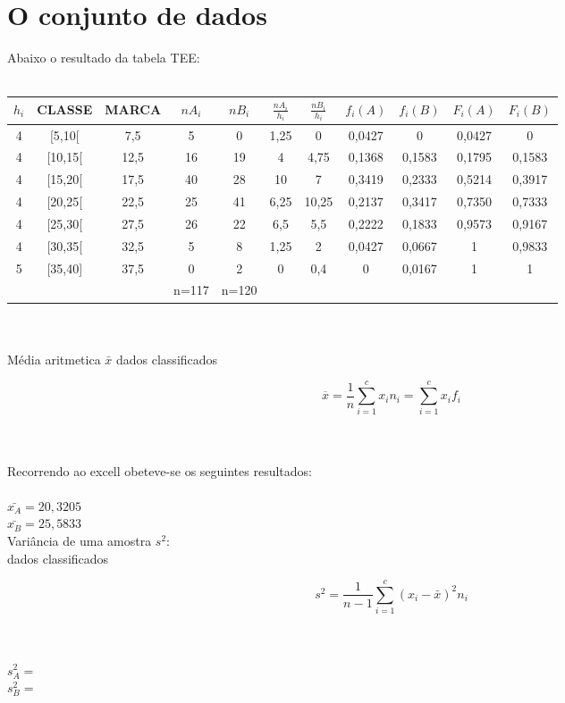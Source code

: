 \section{O conjunto de dados}\label{dados}
Abaixo o resultado da tabela TEE:
\\
\\
\begin{minipage}{0pt}
	\begin{tabular}{ |c|c|c|c|c|c|c|c|c|c|c| }
\hline
$h_i$ & CLASSE & MARCA & $nA_i$ & $nB_i$ & $\frac{nA_i}{h_i}$	 & $\frac{nB_i}{h_i}$ & $f_i(A)$	& $f_i(B)$ & $F_i(A)$ & $F_i(B)$ \\
\hline
4 & [5,10[ & 7,5 & 5 & 0 & 1,25 & 0 & 0,0427 & 0 & 0,0427 & 0 \\
\hline
4 & [10,15[ & 12,5 & 16 & 19 & 4 & 4,75 & 0,1368 & 0,1583 & 0,1795 & 0,1583 \\
\hline
4 & [15,20[ & 17,5 & 40 & 28 & 10 & 7 & 0,3419 & 0,2333 & 0,5214 & 0,3917 \\
\hline
4 & [20,25[ & 22,5 & 25 & 41 & 6,25 & 10,25 & 0,2137 & 0,3417 & 0,7350 & 0,7333 \\
\hline
4 & [25,30[ & 27,5 & 26 & 22 & 6,5 & 5,5 & 0,2222 & 0,1833 & 0,9573 & 0,9167 \\
\hline
4 & [30,35[ & 32,5 & 5 & 8 & 1,25 & 2 & 0,0427 & 0,0667 & 1 & 0,9833 \\
\hline
5 & [35,40] & 37,5 & 0 & 2 & 0 & 0,4 & 0 & 0,0167 & 1 & 1 \\
\hline
& & & n=117 & n=120 & & & & & & \\
\hline
	\end{tabular}
\end{minipage}
\\
\\
Média aritmetica $\bar{x}$ dados classificados \\
\begin{minipage}{0pt}
\[\overline{x} = \frac{1}{n}\sum_{i=1}^cx_in_i = \sum_{i=1}^cx_if_i\]
\end{minipage}
\\
\\
Recorrendo ao excell obeteve-se os seguintes resultados:
\\
\\
$\bar{x_A}=20,3205$ \\
$\bar{x_B}=25,5833$ \\
Variância de uma amostra $s^2$: \\
dados classificados \\
\begin{minipage}{0pt}
\[s^2 = \frac{1}{n-1}\sum_{i=1}^c (x_i-\bar{x})^2 n_i\]
\end{minipage}
\\
\\
$s_A^2=$ \\
$s_B^2=$ \\
\\


